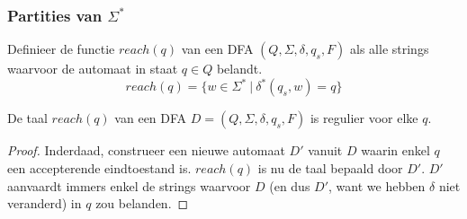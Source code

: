 \documentclass[main.tex]{subfiles}
\begin{document}
\subsubsection{Partities van $\Sigma^{*}$}
\label{sec:partities-van-sigma-ster}

\begin{de}
  Definieer de functie $reach(q)$ van een DFA $(Q,\Sigma,\delta,q_{s},F)$ als alle strings waarvoor de automaat in staat $q\in Q$ belandt.
  \[
  reach(q) = \{ w \in \Sigma^{*}\ |\ \delta^{*}(q_{s},w) = q \}
  \]
\end{de}

\begin{st}
  De taal $reach(q)$ van een DFA $D = (Q,\Sigma,\delta,q_{s},F)$ is regulier voor elke $q$.
  
  \begin{proof}
    Inderdaad, construeer een nieuwe automaat $D'$ vanuit $D$ waarin enkel $q$ een accepterende eindtoestand is.
    $reach(q)$ is nu de taal bepaald door $D'$. $D'$ aanvaardt immers enkel de strings waarvoor $D$ (en dus $D'$, want we hebben $\delta$ niet veranderd) in $q$ zou belanden.
  \end{proof}
\end{st}
\end{document}
